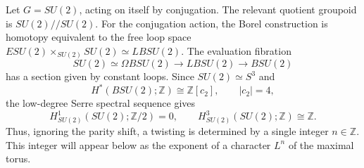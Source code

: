 \documentclass[12pt]{article}
\begin{document}
\begin{example}
    Let $G=SU(2)$, acting on itself by conjugation. The relevant quotient groupoid is $SU(2)//SU(2)$. For the conjugation action, the Borel construction is homotopy equivalent to the free loop space $ESU(2)\times_{SU(2)}SU(2)\simeq LBSU(2)$.
    The evaluation fibration
    \[
        SU(2)\simeq \Omega BSU(2)\longrightarrow LBSU(2)\longrightarrow BSU(2)
    \]
    has a section given by constant loops. Since \(SU(2)\simeq S^3\) and
    \[
        H^*(BSU(2);\mathbb Z)\cong \mathbb Z[c_2],\qquad |c_2|=4,
    \]
    the low-degree Serre spectral sequence gives
    \[
        H^1_{SU(2)}(SU(2);\mathbb Z/2)=0,
        \qquad
        H^3_{SU(2)}(SU(2);\mathbb Z)\cong \mathbb Z.
    \]
    Thus, ignoring the parity shift, a twisting is determined by a single integer $n\in \mathbb Z$. This integer will appear below as the exponent of a character $L^n$ of the maximal torus.


\end{example}
\end{document}
